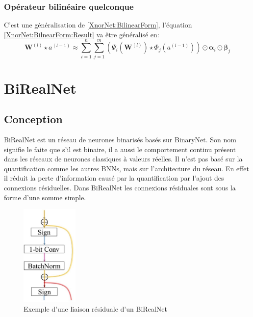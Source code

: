 \subsubsection{Opérateur bilinéaire quelconque}\label{ABCNet:BilinearForm}
C'est une généralisation de \ref{XnorNet:BilinearForm}, l'équation \eqref{XnorNet:BilnearForm:Result} va être généralisé en:
\begin{equation}\label{ABCNet:BilnearForm:Result}
	\boldsymbol{W}^{(l)}\star a^{(l-1)} \approx \sum_{i=1}^n\sum_{j=1}^m  \left( \Psi_i\left(\boldsymbol{W}^{(l)}\right) \star \Phi_j \left(a^{(l-1)}\right)\right) \odot \boldsymbol{\alpha}_i \odot \boldsymbol{\beta}_j
\end{equation}
\newpage 
\section{BiRealNet}
\subsection{Conception}
BiRealNet\cite{BiRealNetPaper} est un réseau de neurones binarisés basés sur BinaryNet.
\newline Son nom signifie le faite que s'il est binaire, il a aussi le comportement continu présent dans les réseaux de neurones classiques à valeurs réelles.
\newline Il n'est pas basé sur la quantification comme les autres BNNs, mais sur l'architecture du réseau. En effet il réduit la perte d'information causé par la quantification par l'ajout des connexions résiduelles. Dans BiRealNet les connexions résiduales sont sous la forme d'une somme simple.
\begin{figure}[h!]
	\centering
	\includegraphics[width=0.25\textwidth]{Figures/BiRealNet.png}
	\caption{Exemple d'une liaison résiduale d'un BiRealNet}
	\label{fig:BiRealNet}
\end{figure}


